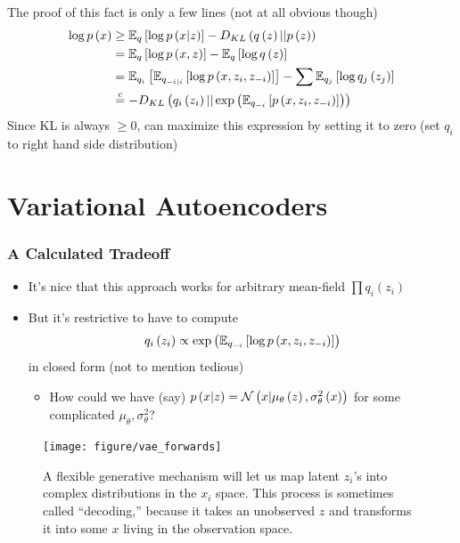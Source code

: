 \documentclass[10pt,mathserif]{beamer}
\begin{document}

\begin{frame}
  The proof of this fact is only a few lines (not at all obvious though)
  \begin{align*}
    \log p\left(x\right) &\geq
    \mathbb{E}_{q}\left[{\log p\left(x \vert z\right)}\right] - D_{KL}\left( q\left(z\right) \vert\vert p\left(z\right)\right) \\
    &= \mathbb{E}_{q}\left[{\log p\left(x, z\right)}\right] - \mathbb{E}_{q}\left[{\log q\left(z\right)}\right]\\
    &= \mathbb{E}_{q_i}\left[{\mathbb{E}_{q_{-i \vert i}}\left[{\log p\left(x, z_i, z_{-i}\right)}\right]}\right] - \sum \mathbb{E}_{q_j}\left[{\log q_j\left(z_j\right)}\right] \\
    &\stackrel{c}{=} -D_{KL}\left(q_{i}\left(z_i\right) \vert \vert \operatorname{exp}\left(\mathbb{E}_{q_{-i}}\left[{p\left(x, z_i, z_{-i}\right)}\right]\right)\right)
  \end{align*}
  Since KL is always $\geq 0$, can maximize this expression by setting it to zero
  (set $q_i$ to right hand side distribution)
\end{frame}

\section{Variational Autoencoders}

\begin{frame}
  \frametitle{A Calculated Tradeoff}
  \begin{itemize}
  \item It's nice that this approach works for arbitrary mean-field $\prod
    q_{i}\left(z_i\right)$
  \item But it's restrictive to have to compute
    \begin{align*}
      q_i\left(z_i\right) \propto \operatorname{exp}\left(\mathbb{E}_{q_{-i}}\left[{\log p\left(x, z_i, z_{-i}\right)}\right]\right)
    \end{align*}
    in closed form (not to mention tedious)
    \begin{itemize}
    \item How could we have (say) $p\left(x \vert z\right) = \mathcal{N}\left(x \vert
      \mu_{\theta}\left(z\right), \sigma^{2}_{\theta}\left(x\right)\right)$ for some
      complicated $\mu_{\theta}, \sigma^{2}_{\theta}$?
    \end{itemize}
  \end{itemize}
\begin{figure}[ht]
  \centering
  \texttt{[image: figure/vae\_forwards]}
  \caption{A flexible generative mechanism will let us map latent $z_i$'s into
    complex distributions in the $x_i$ space. This process is sometimes called
    ``decoding,'' because it takes an unobserved $z$ and transforms it into some
    $x$ living in the observation space. \label{fig:vae_forwards} }
\end{figure}

\end{frame}
\end{document}
